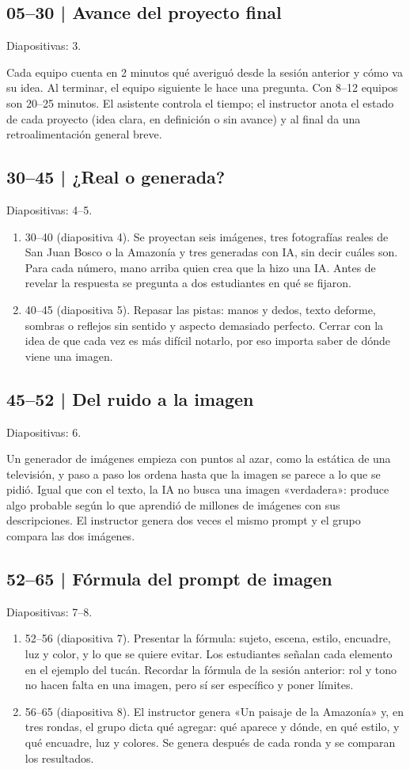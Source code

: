 \documentclass[11pt,a4paper]{article}
\newcommand{\diapos}[1]{\textcolor{gris}{\small\textsf{Diapositivas: #1}}\par}
\begin{document}
\subsection{05--30 | Avance del proyecto final}
\diapos{3.}
Cada equipo cuenta en 2 minutos qué averiguó desde la sesión anterior y cómo va su idea. Al terminar, el equipo siguiente le hace una pregunta. Con 8--12 equipos son 20--25 minutos. El asistente controla el tiempo; el instructor anota el estado de cada proyecto (idea clara, en definición o sin avance) y al final da una retroalimentación general breve.

\subsection{30--45 | ¿Real o generada?}
\diapos{4--5.}
\begin{enumerate}
\item 30--40 (diapositiva 4). Se proyectan seis imágenes, tres fotografías reales de San Juan Bosco o la Amazonía y tres generadas con IA, sin decir cuáles son. Para cada número, mano arriba quien crea que la hizo una IA. Antes de revelar la respuesta se pregunta a dos estudiantes en qué se fijaron.
\item 40--45 (diapositiva 5). Repasar las pistas: manos y dedos, texto deforme, sombras o reflejos sin sentido y aspecto demasiado perfecto. Cerrar con la idea de que cada vez es más difícil notarlo, por eso importa saber de dónde viene una imagen.
\end{enumerate}

\subsection{45--52 | Del ruido a la imagen}
\diapos{6.}
Un generador de imágenes empieza con puntos al azar, como la estática de una televisión, y paso a paso los ordena hasta que la imagen se parece a lo que se pidió. Igual que con el texto, la IA no busca una imagen «verdadera»: produce algo probable según lo que aprendió de millones de imágenes con sus descripciones. El instructor genera dos veces el mismo prompt y el grupo compara las dos imágenes.

\subsection{52--65 | Fórmula del prompt de imagen}
\diapos{7--8.}
\begin{enumerate}
\item 52--56 (diapositiva 7). Presentar la fórmula: sujeto, escena, estilo, encuadre, luz y color, y lo que se quiere evitar. Los estudiantes señalan cada elemento en el ejemplo del tucán. Recordar la fórmula de la sesión anterior: rol y tono no hacen falta en una imagen, pero sí ser específico y poner límites.
\item 56--65 (diapositiva 8). El instructor genera «Un paisaje de la Amazonía» y, en tres rondas, el grupo dicta qué agregar: qué aparece y dónde, en qué estilo, y qué encuadre, luz y colores. Se genera después de cada ronda y se comparan los resultados.
\end{enumerate}
\end{document}
